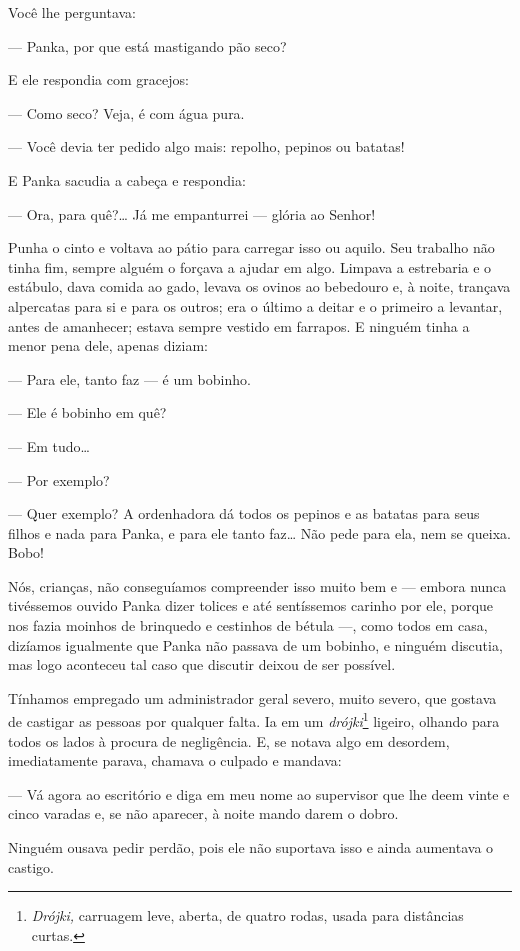 Você lhe perguntava:

--- Panka, por que está mastigando pão seco?

E ele respondia com gracejos:

--- Como seco? Veja, é com água pura.

--- Você devia ter pedido algo mais: repolho, pepinos ou batatas!

E Panka sacudia a cabeça e respondia:

--- Ora, para quê?\ldots{} Já me empanturrei --- glória ao Senhor!

Punha o cinto e voltava ao pátio para carregar isso ou aquilo. Seu
trabalho não tinha fim, sempre alguém o forçava a ajudar em algo.
Limpava a estrebaria e o estábulo, dava comida ao gado, levava os ovinos
ao bebedouro e, à noite, trançava alpercatas para si e para os outros;
era o último a deitar e o primeiro a levantar, antes de amanhecer;
estava sempre vestido em farrapos. E ninguém tinha a menor pena dele, apenas
diziam:

--- Para ele, tanto faz --- é um bobinho.

--- Ele é bobinho em quê?

--- Em tudo\ldots{}

--- Por exemplo?

--- Quer exemplo? A ordenhadora dá todos os pepinos e as batatas para
seus filhos e nada para Panka, e para ele tanto faz\ldots{} Não pede para
ela, nem se queixa. Bobo!

Nós, crianças, não conseguíamos compreender isso muito bem e --- embora
nunca tivéssemos ouvido Panka dizer tolices e até sentíssemos carinho
por ele, porque nos fazia moinhos de brinquedo e cestinhos de bétula ---, como todos em casa, dizíamos igualmente que Panka não passava de
um bobinho, e ninguém discutia, mas logo aconteceu tal caso que discutir deixou de ser possível.

Tínhamos empregado um administrador geral severo, muito severo, que
gostava de castigar as pessoas por qualquer falta. Ia em um
\emph{drójki}\footnote{\emph{Drójki,} carruagem leve, aberta, de
  quatro rodas, usada para distâncias curtas.} ligeiro, olhando para
todos os lados à procura de negligência. E, se notava algo em desordem,
imediatamente parava, chamava o culpado e mandava:

--- Vá agora ao escritório e diga em meu nome ao supervisor que lhe deem
vinte e cinco varadas e, se não aparecer, à noite mando darem o dobro.

Ninguém ousava pedir perdão, pois ele não suportava isso e ainda
aumentava o castigo.

